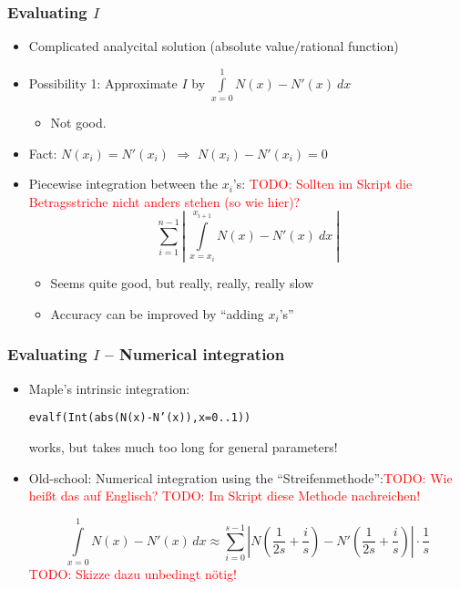 \documentclass{beamer}
\newcommand{\todo}[1]{\textcolor{red}{TODO: #1}}
\begin{document}
\begin{frame}
  \frametitle{Evaluating $I$}
  \begin{itemize}
  \item Complicated analycital solution (absolute value/rational function)
  \item Possibility 1: Approximate $I$ by $\int\limits_{x=0}^1 N(x) - N'(x) \  dx$
    \begin{itemize}
    \item Not good.
    \end{itemize}
  \item Fact: $N(x_i) = N'(x_i)$ 
    $\Rightarrow$ $N(x_i) - N'(x_i) = 0$
  \item Piecewise integration between the $x_i$'s: \todo{Sollten im Skript die Betragsstriche nicht anders stehen (so wie hier)?}
    \begin{equation*}
      \sum\limits_{i=1}^{n-1} \left|\ \int\limits_{x=x_i}^{x_{i+1}} N(x) - N'(x) \  dx\ \right|
    \end{equation*}
    \begin{itemize}
    \item Seems quite good, but really, really, really slow
    \item Accuracy can be improved by ``adding $x_i$'s''
    \end{itemize}
  \end{itemize}
\end{frame}

\begin{frame}
  \frametitle{Evaluating $I$ -- Numerical integration}
  \begin{itemize}
  \item Maple's intrinsic integration:  
    \begin{center}
      \texttt{evalf(Int(abs(N(x)-N'(x)),x=0..1))}
    \end{center}
    works, but takes much too long for general parameters!
  \item Old-school: Numerical integration using the ``Streifenmethode'':\todo{Wie heißt das auf Englisch?} \todo{Im Skript diese Methode nachreichen!}
    
    \begin{equation*}
      \int\limits_{x=0}^1 N(x)-N'(x)\,dx \approx \sum_{i=0}^{s-1} \left| N\left(\frac{1}{2s} + \frac{i}{s}\right) - N'\left(\frac{1}{2s} + \frac{i}{s}\right) \right| \cdot \frac{1}{s}
    \end{equation*}
    \todo{Skizze dazu unbedingt nötig!}
  \end{itemize}
\end{frame}
\end{document}
